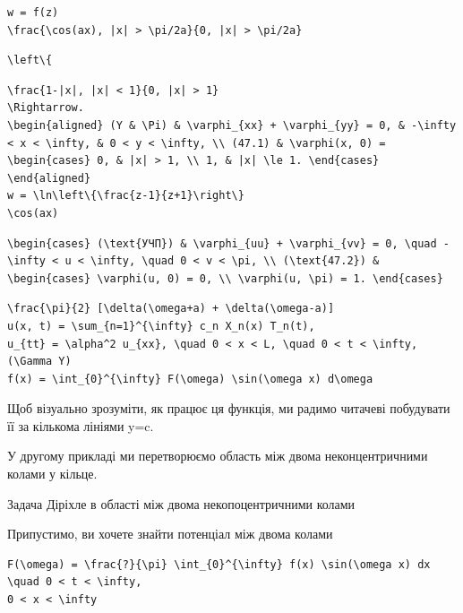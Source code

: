 \documentclass[
  ukrainian,
]{article}
\begin{document}
\begin{verbatim}
w = f(z)
\frac{\cos(ax), |x| > \pi/2a}{0, |x| > \pi/2a}
\end{verbatim}

\begin{verbatim}
\left\{
\end{verbatim}

\begin{verbatim}
\frac{1-|x|, |x| < 1}{0, |x| > 1}
\Rightarrow.
\begin{aligned} (Y & \Pi) & \varphi_{xx} + \varphi_{yy} = 0, & -\infty < x < \infty, & 0 < y < \infty, \\ (47.1) & \varphi(x, 0) = \begin{cases} 0, & |x| > 1, \\ 1, & |x| \le 1. \end{cases} \end{aligned}
w = \ln\left\{\frac{z-1}{z+1}\right\}
\cos(ax)
\end{verbatim}

\begin{verbatim}
\begin{cases} (\text{УЧП}) & \varphi_{uu} + \varphi_{vv} = 0, \quad -\infty < u < \infty, \quad 0 < v < \pi, \\ (\text{47.2}) & \begin{cases} \varphi(u, 0) = 0, \\ \varphi(u, \pi) = 1. \end{cases}
\end{verbatim}

\begin{verbatim}
\frac{\pi}{2} [\delta(\omega+a) + \delta(\omega-a)]
u(x, t) = \sum_{n=1}^{\infty} c_n X_n(x) T_n(t),
u_{tt} = \alpha^2 u_{xx}, \quad 0 < x < L, \quad 0 < t < \infty,
(\Gamma Y)
f(x) = \int_{0}^{\infty} F(\omega) \sin(\omega x) d\omega
\end{verbatim}

Щоб візуально зрозуміти, як працює ця функція, ми радимо читачеві
побудувати її за кількома лініями y=c.

У другому прикладі ми перетворюємо область між двома неконцентричними
колами у кільце.

Задача Діріхле в області між двома некопоцентричними колами

Припустимо, ви хочете знайти потенціал між двома колами

\begin{verbatim}
F(\omega) = \frac{?}{\pi} \int_{0}^{\infty} f(x) \sin(\omega x) dx
\quad 0 < t < \infty,
0 < x < \infty
\end{verbatim}
\end{document}
